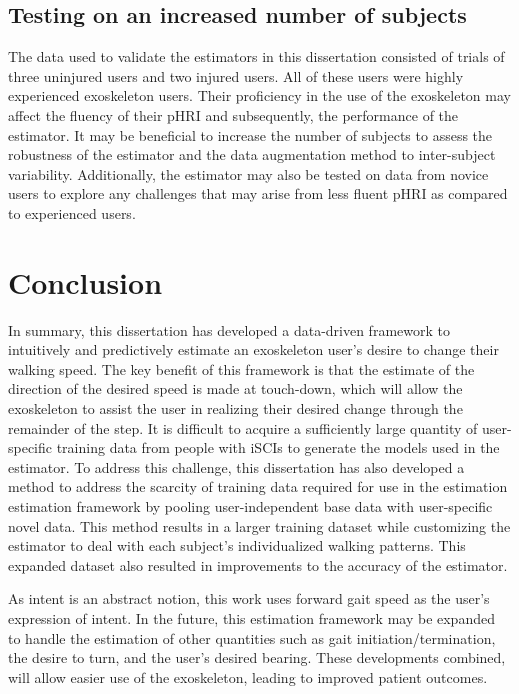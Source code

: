 \subsection{Testing on an increased number of subjects}

The data used to validate the estimators in this dissertation consisted of trials of three uninjured users and two injured users. All of these users were highly experienced exoskeleton users. Their proficiency in the use of the exoskeleton may affect the fluency of their pHRI and subsequently, the performance of the estimator. It may be beneficial to increase the number of subjects to assess the robustness of the estimator and the data augmentation method to inter-subject variability. Additionally, the estimator may also be tested on data from novice users to explore any challenges that may arise from less fluent pHRI as compared to experienced users.

\section{Conclusion}

In summary, this dissertation has developed a data-driven framework to intuitively and predictively estimate an exoskeleton user's desire to change their walking speed. The key benefit of this framework is that the estimate of the direction of the desired speed is made at touch-down, which will allow the exoskeleton to assist the user in realizing their desired change through the remainder of the step. It is difficult to acquire a sufficiently large quantity of user-specific training data from people with iSCIs to generate the models used in the estimator. To address this challenge, this dissertation has also developed a method to address the scarcity of training data required for use in the estimation estimation framework by pooling user-independent base data with user-specific novel data. This method results in a larger training dataset while customizing the estimator to deal with each subject's individualized walking patterns. This expanded dataset also resulted in improvements to the accuracy of the estimator.

As intent is an abstract notion, this work uses forward gait speed as the user's expression of intent. In the future, this estimation framework may be expanded to handle the estimation of other quantities such as gait initiation/termination, the desire to turn, and the user's desired bearing. These developments combined, will allow easier use of the exoskeleton, leading to improved patient outcomes.